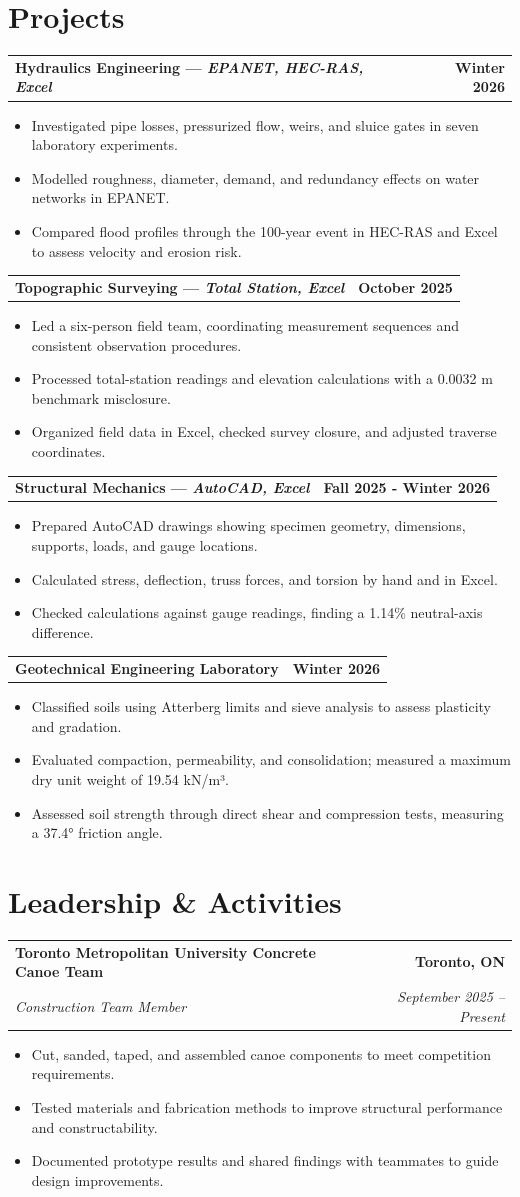 \documentclass[11pt]{article}
\newcommand{\entry}[4]{%
  \begin{tabularx}{\textwidth}{X r}
    \textbf{#1} & \textbf{#2} \\
    \textit{#3} & \textit{#4} \\
  \end{tabularx}\vspace{-2pt}
}
\newcommand{\entrySingle}[2]{%
  \begin{tabularx}{\textwidth}{X r}
    \textbf{#1} & \textbf{#2}
  \end{tabularx}\vspace{-2pt}
}
\newcommand{\tightItem}[1]{\item \small #1}
\begin{document}
\section*{Projects}
\entrySingle{Hydraulics Engineering \;—\; \textit{EPANET, HEC-RAS, Excel}}{Winter 2026}
\begin{itemize}
  \tightItem{Investigated pipe losses, pressurized flow, weirs, and sluice gates in seven laboratory experiments.}
  \tightItem{Modelled roughness, diameter, demand, and redundancy effects on water networks in EPANET.}
  \tightItem{Compared flood profiles through the 100-year event in HEC-RAS and Excel to assess velocity and erosion risk.}
\end{itemize}

\entrySingle{Topographic Surveying  \;—\; \textit{Total Station, Excel}}{October 2025}
\begin{itemize}
  \tightItem{Led a six-person field team, coordinating measurement sequences and consistent observation procedures.}
  \tightItem{Processed total-station readings and elevation calculations with a 0.0032 m benchmark misclosure.}
  \tightItem{Organized field data in Excel, checked survey closure, and adjusted traverse coordinates.}
\end{itemize}

\entrySingle{Structural Mechanics \;—\; \textit{AutoCAD, Excel}}{Fall 2025 - Winter 2026}
\begin{itemize}
  \tightItem{Prepared AutoCAD drawings showing specimen geometry, dimensions, supports, loads, and gauge locations.}
  \tightItem{Calculated stress, deflection, truss forces, and torsion by hand and in Excel.}
\tightItem{Checked calculations against gauge readings, finding a 1.14\% neutral-axis difference.}
\end{itemize}

\entrySingle{Geotechnical Engineering Laboratory}{Winter 2026}
\begin{itemize}
  \tightItem{Classified soils using Atterberg limits and sieve analysis to assess plasticity and gradation.}
  \tightItem{Evaluated compaction, permeability, and consolidation; measured a maximum dry unit weight of 19.54 kN/m³.}
  \tightItem{Assessed soil strength through direct shear and compression tests, measuring a 37.4° friction angle.}
\end{itemize}

\section*{Leadership \& Activities}
\entry
{Toronto Metropolitan University Concrete Canoe Team}{Toronto, ON}
{Construction Team Member }{September 2025 -- Present}
\begin{itemize}
  \tightItem{Cut, sanded, taped, and assembled canoe components to meet competition requirements.}
  \tightItem{Tested materials and fabrication methods to improve structural performance and constructability.}
  \tightItem{Documented prototype results and shared findings with teammates to guide design improvements.}
\end{itemize}
\end{document}
